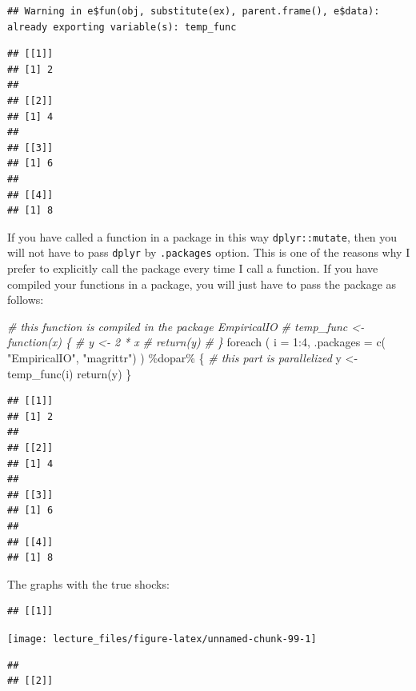 \documentclass[
]{book}
\newenvironment{Shaded}{\begin{snugshade}}{\end{snugshade}}
\newcommand{\AttributeTok}[1]{\textcolor[rgb]{0.77,0.63,0.00}{#1}}
\newcommand{\CommentTok}[1]{\textcolor[rgb]{0.56,0.35,0.01}{\textit{#1}}}
\newcommand{\DecValTok}[1]{\textcolor[rgb]{0.00,0.00,0.81}{#1}}
\newcommand{\FunctionTok}[1]{\textcolor[rgb]{0.00,0.00,0.00}{#1}}
\newcommand{\NormalTok}[1]{#1}
\newcommand{\OtherTok}[1]{\textcolor[rgb]{0.56,0.35,0.01}{#1}}
\newcommand{\SpecialCharTok}[1]{\textcolor[rgb]{0.00,0.00,0.00}{#1}}
\newcommand{\StringTok}[1]{\textcolor[rgb]{0.31,0.60,0.02}{#1}}
\begin{document}
\begin{verbatim}
## Warning in e$fun(obj, substitute(ex), parent.frame(), e$data): already exporting variable(s): temp_func
\end{verbatim}

\begin{verbatim}
## [[1]]
## [1] 2
## 
## [[2]]
## [1] 4
## 
## [[3]]
## [1] 6
## 
## [[4]]
## [1] 8
\end{verbatim}

If you have called a function in a package in this way \texttt{dplyr::mutate}, then you will not have to pass \texttt{dplyr} by \texttt{.packages} option. This is one of the reasons why I prefer to explicitly call the package every time I call a function. If you have compiled your functions in a package, you will just have to pass the package as follows:

\begin{Shaded}
\begin{Highlighting}[]
\CommentTok{\# this function is compiled in the package EmpiricalIO}
\CommentTok{\# temp\_func \textless{}{-} function(x) \{}
\CommentTok{\#   y \textless{}{-} 2 * x}
\CommentTok{\#   return(y)}
\CommentTok{\# \}}
\FunctionTok{foreach}\NormalTok{ (}
  \AttributeTok{i =} \DecValTok{1}\SpecialCharTok{:}\DecValTok{4}\NormalTok{, }
  \AttributeTok{.packages =} \FunctionTok{c}\NormalTok{(}
    \StringTok{"EmpiricalIO"}\NormalTok{,}
    \StringTok{"magrittr"}\NormalTok{)}
\NormalTok{  ) }\SpecialCharTok{\%dopar\%}\NormalTok{ \{}
    \CommentTok{\# this part is parallelized}
\NormalTok{    y }\OtherTok{\textless{}{-}} \FunctionTok{temp\_func}\NormalTok{(i)}
    \FunctionTok{return}\NormalTok{(y)}
\NormalTok{\}}
\end{Highlighting}
\end{Shaded}

\begin{verbatim}
## [[1]]
## [1] 2
## 
## [[2]]
## [1] 4
## 
## [[3]]
## [1] 6
## 
## [[4]]
## [1] 8
\end{verbatim}

The graphs with the true shocks:

\begin{verbatim}
## [[1]]
\end{verbatim}

\begin{center}\texttt{[image: lecture\_files/figure-latex/unnamed-chunk-99-1]} \end{center}

\begin{verbatim}
## 
## [[2]]
\end{verbatim}
\end{document}

